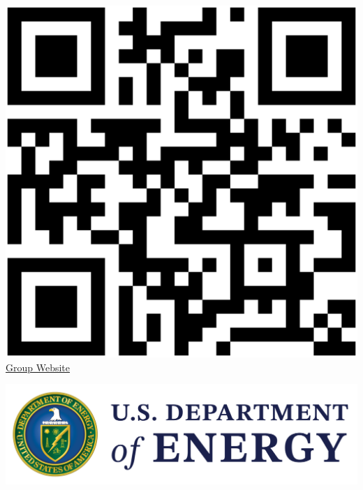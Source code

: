 {\begin{center}
    \begin{minipage}{.2\linewidth}
        \centering
        \includegraphics[width=.8\linewidth]{img/qrcode.eps}
        \vspace{-1em}
        \href{https://arfc.github.io/}{\underline{Group Website}}
    \end{minipage}
    \begin{minipage}{0.7\linewidth}
        \begin{tcolorbox}[colback=white, colframe=black, width=\linewidth, height=.275\linewidth, boxrule=1pt]
            \begin{center}
                \begin{minipage}{.3\linewidth}
                    \begin{center}
                        \includegraphics[width = \linewidth]{img/doe.png}
                        \newline\vspace{-1.5em}

\end{center}
\end{minipage}
\end{center}
\end{tcolorbox}
\end{minipage}
\end{center}}
